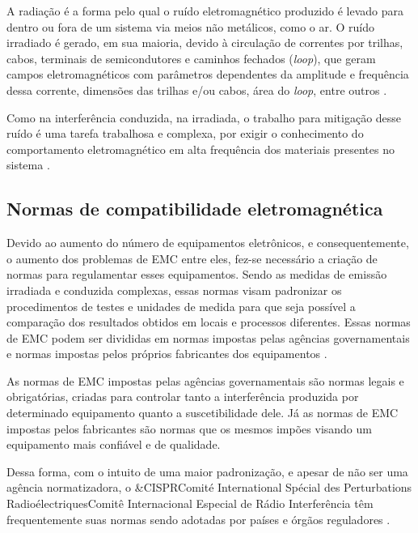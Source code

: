         A radiação é a forma pelo qual o ruído eletromagnético produzido é levado para dentro ou fora de um sistema via meios não metálicos, como o ar. O ruído irradiado é gerado, em sua maioria, devido à circulação de correntes por trilhas, cabos, terminais de semicondutores e caminhos fechados (\textit{loop}), que geram campos eletromagnéticos com parâmetros dependentes da amplitude e frequência dessa corrente, dimensões das trilhas e/ou cabos, área do \textit{loop}, entre outros \cite{ref:EMC_msc_muriel}.
        
        Como na interferência conduzida, na irradiada, o trabalho para mitigação desse ruído é uma tarefa trabalhosa e complexa, por exigir o conhecimento do comportamento eletromagnético em alta frequência dos materiais presentes no sistema \cite{ref:EMC_phd_schlichting}.
        
        \subsection{Normas de compatibilidade eletromagnética} \label{cap:fund_emc_norma}
        
        Devido ao aumento do número de equipamentos eletrônicos, e consequentemente, o aumento dos problemas de EMC entre eles, fez-se necessário a criação de normas para regulamentar esses equipamentos. Sendo as medidas de emissão irradiada e conduzida complexas, essas normas visam padronizar os procedimentos de testes e unidades de medida para que seja possível a comparação dos resultados obtidos em locais e processos diferentes. Essas normas de EMC podem ser divididas em normas impostas pelas agências governamentais e normas impostas pelos próprios fabricantes dos equipamentos \cite{ref:EMC_phd_schlichting}. 
        
        As normas de EMC impostas pelas agências governamentais são normas legais e obrigatórias, criadas para controlar tanto a interferência produzida por determinado equipamento quanto a suscetibilidade dele. Já as normas de EMC impostas pelos fabricantes são normas que os mesmos impões visando um equipamento mais confiável e de qualidade.
        
        Dessa forma, com o intuito de uma maior padronização, e apesar de não ser uma agência normatizadora, o \abreviatura&{CISPR}{Comité International Spécial des Perturbations Radioélectriques}{Comitê Internacional Especial de Rádio Interferência} têm frequentemente suas normas sendo adotadas por países e órgãos reguladores \cite{ref:EMC_iec_about, ref:EMC_phd_schlichting}.
        
